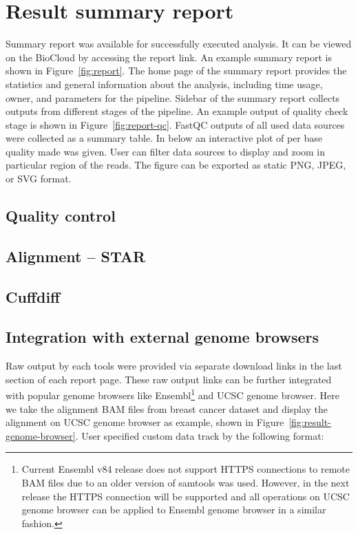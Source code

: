 \section{Result summary report}

Summary report was available for successfully executed analysis. It can be
viewed on the BioCloud by accessing the report link. An example summary report
is shown in Figure~\ref{fig:report}. The home page of the summary report
provides the statistics and general information about the analysis, including
time usage, owner, and parameters for the pipeline. Sidebar of the summary
report collects outputs from different stages of the pipeline. An example output
of quality check stage is shown in Figure~\ref{fig:report-qc}. FastQC outputs
of all used data sources were collected as a summary table. In below an
interactive plot of per base quality made was given. User can filter data
sources to display and zoom in particular region of the reads. The figure can
be exported as static PNG, JPEG, or SVG format.




\subsection{Quality control}




\subsection{Alignment -- STAR}








\subsection{Cuffdiff}




\subsection{Integration with external genome browsers}

Raw output by each tools were provided via separate download links in the last
section of each report page. These raw output links can be further integrated
with popular genome browsers like Ensembl\footnote{
    Current Ensembl v84 release does not support HTTPS connections to remote
    BAM files due to an older version of samtools was used. However, in the
    next release the HTTPS connection will be supported and all operations on
    UCSC genome browser can be applied to Ensembl genome browser in a similar
    fashion.
} and UCSC genome browser. Here we take the alignment BAM files from breast cancer
dataset and display the alignment on UCSC genome browser as example, shown in
Figure~\ref{fig:result-genome-browser}. User specified custom data track by the
following format:

